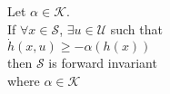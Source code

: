 \documentclass[preview]{standalone}
\begin{document}
\begin{center}
Let $\alpha \in \mathcal{K}$.\\If $\forall x \in \mathcal{S}$, $\exists u \in \mathcal{U}$ such that \\$\dot h(x, u) \geq - \alpha(h(x))$ \\then $\mathcal{S}$ is forward invariant\\where $\alpha \in \mathcal{K}$
\end{center}
\end{document}
